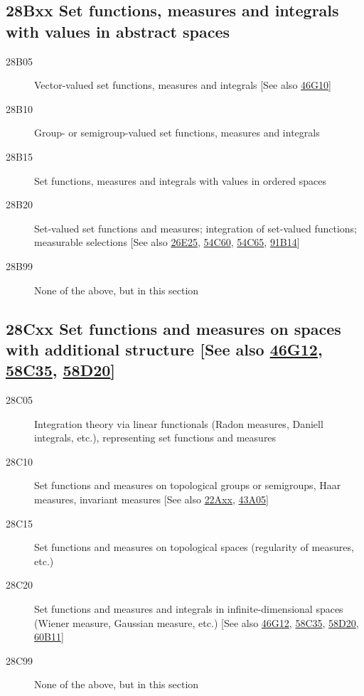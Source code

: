 \documentclass[letterpaper]{article}
\begin{document}
\subsection*{28Bxx  Set functions, measures and integrals with values in abstract spaces }\label{28Bxx}
\begin{description}  
\item [28B05]\label{28B05} Vector-valued set functions, measures and integrals [See also \hyperref[46G10]{46G10}]
\item [28B10]\label{28B10} Group- or semigroup-valued set functions, measures and integrals
\item [28B15]\label{28B15} Set functions, measures and integrals with values in ordered spaces
\item [28B20]\label{28B20} Set-valued set functions and measures; integration of set-valued functions; measurable selections [See also \hyperref[26E25]{26E25}, \hyperref[54C60]{54C60}, \hyperref[54C65]{54C65}, \hyperref[91B14]{91B14}]
\item [28B99]\label{28B99} None of the above, but in this section
\end{description}
\subsection*{28Cxx  Set functions and measures on spaces with additional structure [See also \hyperref[46G12]{46G12}, \hyperref[58C35]{58C35}, \hyperref[58D20]{58D20}] }\label{28Cxx}
\begin{description}  
\item [28C05]\label{28C05} Integration theory via linear functionals (Radon measures, Daniell integrals, etc.), representing set functions and measures
\item [28C10]\label{28C10} Set functions and measures on topological groups or semigroups, Haar measures, invariant measures [See also \hyperref[22Axx]{22Axx}, \hyperref[43A05]{43A05}]
\item [28C15]\label{28C15} Set functions and measures on topological spaces (regularity of measures, etc.)
\item [28C20]\label{28C20} Set functions and measures and integrals in infinite-dimensional spaces (Wiener measure, Gaussian measure, etc.) [See also \hyperref[46G12]{46G12}, \hyperref[58C35]{58C35}, \hyperref[58D20]{58D20}, \hyperref[60B11]{60B11}]
\item [28C99]\label{28C99} None of the above, but in this section
\end{description}
\end{document}
